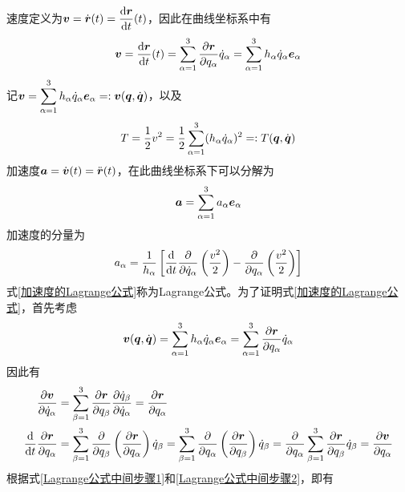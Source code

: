 速度定义为$\boldsymbol{v} = \dot{\boldsymbol{r}}(t) = \dfrac{\mathrm{d} \boldsymbol{r}}{\mathrm{d} t}(t)$，因此在曲线坐标系中有
\begin{equation}
	\boldsymbol{v} = \frac{\mathrm{d} \boldsymbol{r}}{\mathrm{d} t}(t) = \sum_{\alpha=1}^3 \frac{\partial \boldsymbol{r}}{\partial q_\alpha} \dot{q}_\alpha = \sum_{\alpha=1}^3 h_\alpha \dot{q}_\alpha \boldsymbol{e}_\alpha
\end{equation}
记$\displaystyle \boldsymbol{v} = \sum_{\alpha=1}^3 h_\alpha \dot{q}_\alpha \boldsymbol{e}_\alpha =: \boldsymbol{v}(\boldsymbol{q},\dot{\boldsymbol{q}})$，以及
\begin{equation}
	T = \frac12 v^2 = \frac12 \sum_{\alpha=1}^3 (h_\alpha \dot{q}_\alpha)^2 =: T (\boldsymbol{q},\dot{\boldsymbol{q}})
\end{equation}
加速度$\boldsymbol{a} = \dot{\boldsymbol{v}}(t) = \ddot{\boldsymbol{r}}(t)$，在此曲线坐标系下可以分解为
\begin{equation*}
	\boldsymbol{a} = \sum_{\alpha=1}^3 a_\alpha \boldsymbol{e}_\alpha
\end{equation*}
加速度的分量为
\begin{equation}
	a_\alpha = \frac{1}{h_\alpha} \left[\frac{\mathrm{d}}{\mathrm{d} t} \frac{\partial}{\partial \dot{q}_\alpha} \left(\frac{v^2}{2}\right) - \frac{\partial}{\partial q_\alpha} \left(\frac{v^2}{2}\right)\right]
	\label{加速度的Lagrange公式}
\end{equation}
式\eqref{加速度的Lagrange公式}称为{\heiti Lagrange公式}。为了证明式\eqref{加速度的Lagrange公式}，首先考虑
\begin{equation}
	\boldsymbol{v}(\boldsymbol{q},\dot{\boldsymbol{q}}) = \sum_{\alpha=1}^3 h_\alpha \dot{q}_\alpha \boldsymbol{e}_\alpha = \sum_{\alpha=1}^3 \frac{\partial \boldsymbol{r}}{\partial q_\alpha} \dot{q}_\alpha
\end{equation}
因此有
\begin{align}
	\frac{\partial \boldsymbol{v}}{\partial \dot{q}_\alpha} & = \sum_{\beta=1}^3 \frac{\partial \boldsymbol{r}}{\partial q_\beta} \frac{\partial \dot{q}_\beta}{\partial \dot{q}_\alpha} = \frac{\partial \boldsymbol{r}}{\partial q_\alpha} \label{Lagrange公式中间步骤1} \\
	\frac{\mathrm{d}}{\mathrm{d} t} \frac{\partial \boldsymbol{r}}{\partial q_\alpha} & = \sum_{\beta=1}^3 \frac{\partial}{\partial q_\beta} \left(\frac{\partial \boldsymbol{r}}{\partial q_\alpha}\right) \dot{q}_\beta = \sum_{\beta=1}^3 \frac{\partial}{\partial q_\alpha} \left(\frac{\partial \boldsymbol{r}}{\partial q_\beta}\right) \dot{q}_\beta = \frac{\partial}{\partial q_\alpha} \sum_{\beta=1}^3 \frac{\partial \boldsymbol{r}}{\partial q_\beta} \dot{q}_\beta = \frac{\partial \boldsymbol{v}}{\partial q_\alpha}
	\label{Lagrange公式中间步骤2}
\end{align}
根据式\eqref{Lagrange公式中间步骤1}和\eqref{Lagrange公式中间步骤2}，即有
